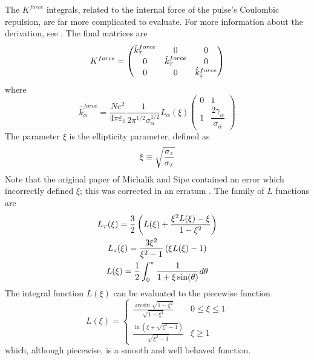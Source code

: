 The $K^{force}$ integrals, related to the internal force of the pulse's Coulombic repulsion, are far more complicated to evaluate.
For more information about the derivation, see \cite{michalik_analytic_2006}.
The final matrices are
\begin{equation}
  K^{force} = 
  \begin{pmatrix}
    \hat{k}^{force}_{{\scriptscriptstyle T}} & 0 & 0 \\
    0 & \hat{k}^{force}_{{\scriptscriptstyle T}} & 0 \\
    0 & 0 & \hat{k}^{force}_{z}
  \end{pmatrix}
\end{equation}
where
\begin{equation}
  \hat{k}^{force}_{\alpha} = 
  \frac{N e^2}{4\pi\varepsilon_0} \frac{1}{2\pi^{1/2}\sigma_{\alpha}^{1/2}} L_{\alpha}(\xi)
  \begin{pmatrix}
    0 & 1 \\
    1 & \dfrac{2 \gamma_{\alpha}}{\sigma_{\alpha}}
  \end{pmatrix}
\end{equation}
The parameter $\xi$ is the ellipticity parameter, defined as
\begin{equation}
  \xi \equiv \sqrt{\dfrac{\sigma_{z}}{\sigma_{{\scriptscriptstyle T}}}}
\end{equation}
Note that the original paper of Michalik and Sipe contained an error which incorrectly defined $\xi$; this was corrected in an erratum \cite{michalik_erratum:_2008}.
The family of $L$ functions are
\begin{gather}
  L_{{\scriptscriptstyle T}}(\xi) = \frac{3}{2} \left( L(\xi) + \frac{\xi^2 L(\xi) - \xi}{ 1 - \xi^2 } \right) \\
  L_{z}(\xi) = \frac{ 3 \xi^2 }{ \xi^2 - 1} \left( \xi L(\xi) - 1 \right) \\
  L(\xi) = \frac{1}{2} \int_0^{\pi} \frac{1}{1+\xi\sin(\theta)} d\theta
\end{gather}
The integral function $L(\xi)$ can be evaluated to the piecewise function
\begin{equation}
  L(\xi) = 
  \begin{cases}
    \frac{ \arcsin \sqrt{1-\xi^2} }{ \sqrt{1-\xi^2} } & 0 \le \xi \le 1 \\
    \frac{ \ln\left( \xi + \sqrt{\xi^2 - 1} \right) }{ \sqrt{\xi^2 - 1} } & \xi \ge 1
  \end{cases}
\end{equation}
which, although piecewise, is a smooth and well behaved function.

